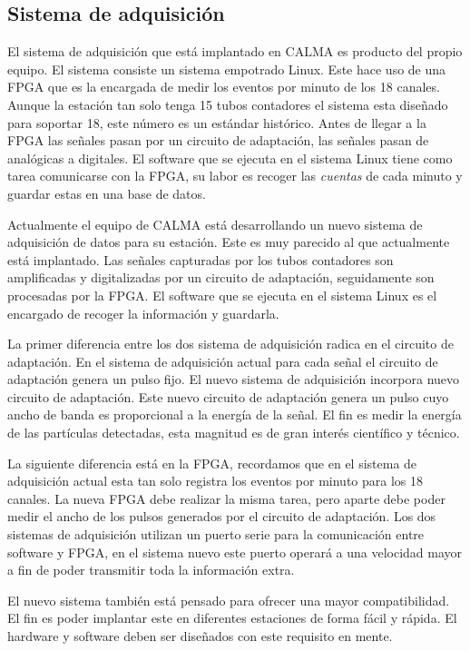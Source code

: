 	\subsection{Sistema de adquisición}
		El sistema de adquisición que está implantado en CALMA es producto del propio equipo\cite{Garcia2014}. El sistema consiste
		un sistema empotrado Linux. Este hace uso de una FPGA que es la encargada de medir los eventos por minuto de los 18 canales. Aunque la
		estación tan solo tenga 15 tubos contadores el sistema esta diseñado para soportar 18, este número es un estándar histórico. Antes de
		llegar a la FPGA las señales pasan por un circuito de adaptación, las señales pasan de analógicas a digitales. El software que se
		ejecuta en el sistema Linux tiene como tarea comunicarse con la FPGA, su labor es recoger las \emph{cuentas} de cada minuto y guardar
		estas en una base de datos.
		\par
		Actualmente el equipo de CALMA está desarrollando un nuevo sistema de adquisición de datos para su estación. Este es muy parecido al
		que actualmente está implantado. Las señales capturadas por los tubos contadores son amplificadas y digitalizadas por un circuito de
		adaptación, seguidamente son procesadas por la FPGA. El software que se ejecuta en el sistema Linux es el encargado de recoger la
		información y guardarla.
		\par
		La primer diferencia entre los dos sistema de adquisición radica en el circuito de adaptación. En el sistema de adquisición actual
		para cada señal el circuito de adaptación genera un pulso fijo. El nuevo sistema de adquisición incorpora nuevo circuito de
		adaptación. Este nuevo circuito de adaptación genera un pulso cuyo ancho de banda es proporcional a la energía de la señal. El fin es
		medir la energía de las partículas detectadas, esta magnitud es de gran interés científico y técnico.
		\par
		La siguiente diferencia está en la FPGA, recordamos que en el sistema de adquisición actual esta tan solo registra los eventos por
		minuto para los 18 canales. La nueva FPGA debe realizar la misma tarea, pero aparte debe poder medir el ancho de los pulsos generados
		por el circuito de adaptación. Los dos sistemas de adquisición utilizan un puerto serie para la comunicación entre software y FPGA, en
		el sistema nuevo este puerto operará a una velocidad mayor a fin de poder transmitir toda la información extra.
		\par
		El nuevo sistema también está pensado para ofrecer una mayor compatibilidad. El fin es poder implantar este en diferentes estaciones
		de forma fácil y rápida. El hardware  y software deben ser diseñados con este requisito en mente.
